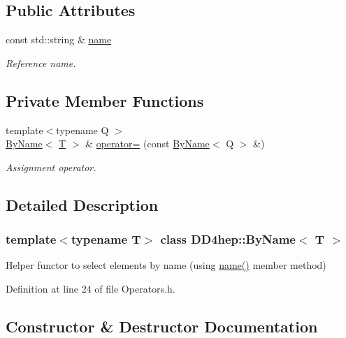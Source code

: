 \subsection*{Public Attributes}
\begin{DoxyCompactItemize}
\item 
const std\+::string \& \hyperlink{class_d_d4hep_1_1_by_name_a06f4c668c9195f670ee1ace07191efa1}{name}
\begin{DoxyCompactList}\small\item\em Reference name. \end{DoxyCompactList}\end{DoxyCompactItemize}
\subsection*{Private Member Functions}
\begin{DoxyCompactItemize}
\item 
{\footnotesize template$<$typename Q $>$ }\\\hyperlink{class_d_d4hep_1_1_by_name}{By\+Name}$<$ \hyperlink{class_t}{T} $>$ \& \hyperlink{class_d_d4hep_1_1_by_name_a3c4a00bee4c7a1128557fe044ebb8e9d}{operator=} (const \hyperlink{class_d_d4hep_1_1_by_name}{By\+Name}$<$ Q $>$ \&)
\begin{DoxyCompactList}\small\item\em Assignment operator. \end{DoxyCompactList}\end{DoxyCompactItemize}


\subsection{Detailed Description}
\subsubsection*{template$<$typename T$>$\newline
class D\+D4hep\+::\+By\+Name$<$ T $>$}

Helper functor to select elements by name (using \hyperlink{class_d_d4hep_1_1_by_name_a06f4c668c9195f670ee1ace07191efa1}{name()} member method) 

Definition at line 24 of file Operators.\+h.



\subsection{Constructor \& Destructor Documentation}
\hypertarget{class_d_d4hep_1_1_by_name_af56a0a47ed14c746731c5b3d7e4eeadd}{}\label{class_d_d4hep_1_1_by_name_af56a0a47ed14c746731c5b3d7e4eeadd} 
